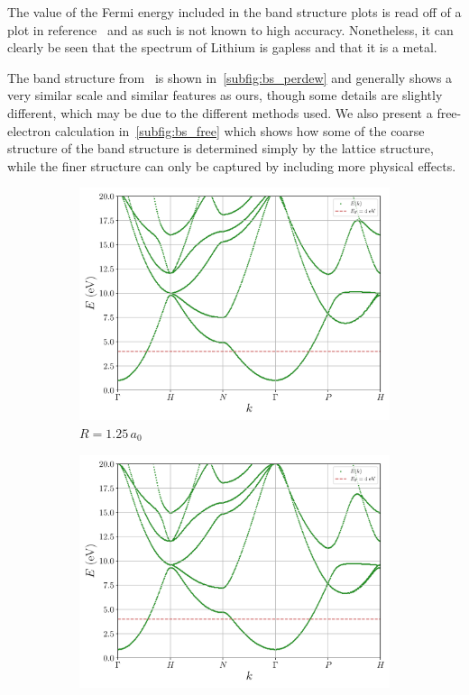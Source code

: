 \documentclass[a4paper,DIV=12,english]{scrartcl}
\begin{document}
The value of the Fermi energy included in the band structure plots is read off of a plot in reference~\cite{perdew_li} and as such is not known to high accuracy. Nonetheless, it can clearly be seen that the spectrum of Lithium is gapless and that it is a metal.

The band structure from~\cite{perdew_li} is shown in~\ref{subfig:bs_perdew} and generally shows a very similar scale and similar features as ours, though some details are slightly different, which may be due to the different methods used. We also present a free-electron calculation in~\ref{subfig:bs_free} which shows how some of the coarse structure of the band structure is determined simply by the lattice structure, while the finer structure can only be captured by including more physical effects.

\begin{figure}
    \centering 
    \begin{subfigure}{0.49\textwidth}
        \centering 
        \includegraphics[width=\textwidth]{../plots/bs_2_R_125.pdf}
        \caption{$R=1.25\,a_0$}
        \label{subfig:bs_2_125}
    \end{subfigure}
    \begin{subfigure}{0.49\textwidth}
        \centering 
        \includegraphics[width=\textwidth]{../plots/bs_2_R_130.pdf}

\end{subfigure}
\end{figure}
\end{document}
